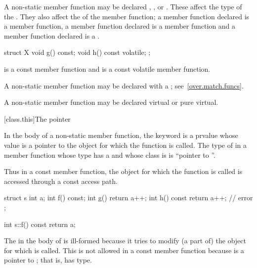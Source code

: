 \pnum
{}%
%
%
A non-static member function may be declared ,
, or  . These
 affect the type of the . They also affect the  of the member function; a member function declared
 is a  member function, a member function
declared  is a  member function and a
member function declared   is a
.
\begin{example}
\begin{codeblock}
struct X {
  void g() const;
  void h() const volatile;
};
\end{codeblock}

 is a const member function and  is a
const volatile member function.
\end{example}

\pnum
A non-static member function may be declared with a ; see~\ref{over.match.funcs}.

\pnum
A non-static member function may be declared
virtual or pure virtual.

[class.this]{The  pointer}%

\pnum
{}%
In the body of a non-static member function, the
keyword  is a prvalue whose value is
a pointer to the object for which the function is called.
%
The type of  in a member function
whose type has a  \cv{} and
whose class is 
is ``pointer to \cv{} ''.
\begin{note}
Thus in a const member function, the object for which the function is
called is accessed through a const access path.
\end{note}
\begin{example}
\begin{codeblock}
struct s {
  int a;
  int f() const;
  int g() { return a++; }
  int h() const { return a++; } // error
};

int s::f() const { return a; }
\end{codeblock}

The  in the body of  is ill-formed because it
tries to modify (a part of) the object for which  is
called. This is not allowed in a const member function because
 is a pointer to ; that is,  has
 type.
\end{example}

